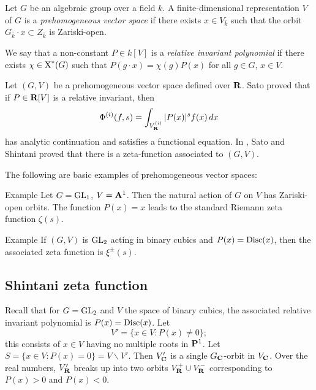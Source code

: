 \begin{defi}[Sato] %
Let $G$ be an algebraic group over a field $k$. A finite-dimensional 
representation $V$ of $G$ is a \emph{prehomogeneous vector space} if 
there exists $x\in V_{\bar k}$ such that the orbit 
$G_{\bar k}\cdot x\subset Z_{\bar k}$ is Zariski-open. 
\end{defi}

We say that a non-constant $P\in k[V]$ is a \emph{relative invariant 
polynomial} if there exists $\chi\in \operatorname{X}^\ast(G)$ such that 
$P(g\cdot x) = \chi(g) P(x)$ for all $g\in G$, $x\in V$. 

Let $(G,V)$ be a prehomogeneous vector space defined over $\mathbf{R}$. Sato proved 
that if $P\in \mathbf{R}[V]$ is a relative invariant, then 
\[
  \Phi^{(i)}(f,s) = \int_{V_{\mathbf{R}}^{(i)}} |P(x)|^s f(x)\, dx
\]
has analytic continuation and satisfies a functional equation. In \cite{ss74}, 
Sato and Shintani proved that there is a zeta-function associated to $(G,V)$. 

The following are basic examples of prehomogeneous vector spaces: 

\begin{enonce}[remark]{Example}
Let $G=\operatorname{GL}_1$, $V=\mathbf{A}^1$. Then the natural action of $G$ on $V$ 
has Zariski-open orbits. The function $P(x)=x$ leads to the standard Riemann 
zeta function $\zeta(s)$. 
\end{enonce}

\begin{enonce}[remark]{Example}
If $(G,V)$ is $\operatorname{GL}_2$ acting in binary cubics and 
$P(x)=\operatorname{Disc}(x)$, then the associated zeta function is 
$\xi^\pm(s)$. 
\end{enonce}





\subsection{Shintani zeta function}

Recall that for $G=\operatorname{GL}_2$ and $V$ the space of binary cubics, 
the associated relative invariant polynomial is $P(x)=\operatorname{Disc}(x)$. Let 
\[
  V' = \{x\in V:P(x)\ne 0\} ;
\]
this consists of $x\in V$ having no multiple roots in $\mathbf{P}^1$. Let 
$S=\{x\in V:P(x)=0\} = V\smallsetminus V'$. Then $V_{\mathbf{C}}'$ is a single 
$G_{\mathbf{C}}$-orbit in $V_{\mathbf{C}}$. Over the real numbers, $V_{\mathbf{R}}'$ breaks up into two 
orbits $V_{\mathbf{R}}^+\cup V_{\mathbf{R}}^-$ corresponding to $P(x)>0$ and $P(x)<0$. 

